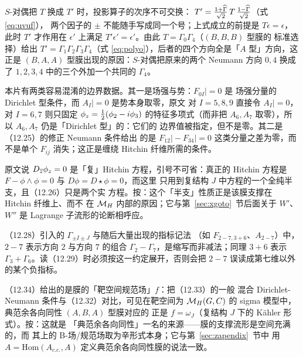 \begin{yizhu}[易错点]
$S$-对偶把 $T$ 换成 $T'$ 时，投影算子的次序不可交换：
$T'={1+{\widehat \Gamma}\over\sqrt 2}\,T\,{1-{\widehat \Gamma}\over\sqrt 2}$（式 \eqref{eq:uvuf}），
两个因子的 $\pm$ 不能随手写成同一个号；上式成立的前提是
$T\epsilon=\epsilon$，此时 $T'$ 才作用在 $\epsilon'$ 上满足
$T'\epsilon'=\epsilon'$。由此 $T=\Gamma_0\Gamma_4$（$(B,B,B)$ 型膜的
标准选择）给出 $T'=\Gamma_1\Gamma_2\Gamma_3\Gamma_4$（式
\eqref{eq:polyo}），后者的四个方向全是「$A$ 型」方向，这正是
$(B,A,A)$ 型膜出现的原因：$S$-对偶把原来的两个 Neumann 方向
$0,4$ 换成了 $1,2,3,4$ 中的三个外加一个共同的 $\Gamma_4$。
\end{yizhu}

\begin{yizhu}[易错点]
本片有两类容易混淆的边界数据。其一是场强与势：$F_{0I}|=0$ 是
场强分量的 Dirichlet 型条件，而 $A_I\vert=0$ 是势本身取零，原文
对 $I=5,8,9$ 直接令 $A_I\vert=0$，对 $I=6,7$ 则只固定
$\phi_z={1\over 2}(\phi_2-i\phi_3)$ 的特征多项式（而非把
$A_6,A_7$ 取零），所以 $A_6,A_7$ 仍是「Dirichlet 型」的：它们的
边界值被指定，但不是零。其二是（12.25）的修正 Neumann 条件给出
的是 $F_{12}\vert-F_{34}\vert=0$ 这类分量之差为零，而不是单个
$F_{ij}$ 消失；这正是缠绕 Hitchin 纤维所需的条件。
\end{yizhu}

\begin{yizhu}[含糊点拨]
原文说 $D_{\overline z}\phi_z=0$ 是「复」Hitchin 方程，引号不可省：真正的
Hitchin 方程是 $F-\phi\wedge\phi=0$ 与 $D\phi=D\star\phi=0$，而这里
只用到复结构 $J$ 中方程的一个全纯半支，且（12.26）只是两个实
方程。按：这个「半支」性质正是该膜支撑在 Hitchin 纤维上、而不
在 ${{{\mathcal{M}}}_H}$ 内部的原因；它与第~\ref{sec:xgoto}~节后面关于 $W'$、$W''$
是 Lagrange 子流形的论断相呼应。
\end{yizhu}

\begin{yizhu}[含糊点拨]
（12.28）引入的 $\Gamma_{\pm I\pm J}$ 与随后大量出现的指标记法
（如 $F_{2-7,3+6}$、$A_{2-7}$）中，$2-7$ 表示方向 $2$ 与方向 $7$
的组合 $\Gamma_2-\Gamma_7$，是缩写而非减法；同理 $3+6$ 表示
$\Gamma_3+\Gamma_6$。读（12.29）时必须按这一约定展开，否则会把
$2-7$ 误读成第七维以外的某个负指标。
\end{yizhu}

\begin{yizhu}[物理图像]
（12.34）给出的是膜的「靶空间规范场」$f$：把（12.33）的一般
混合 Dirichlet-Neumann 条件与（12.32）对比，可见在靶空间为
${{{\mathcal{M}}}_H}(G,C)$ 的 sigma 模型中，典范余各向同性 $(A,B,A)$ 型膜对应的
正是 $f=\omega_J$（复结构 $J$ 下的 Kähler 形式）。按：这就是
「典范余各向同性」一名的来源——膜的支撑流形是空间充满的，而
其上的 B-场/规范场取为辛形式本身；它与第~\ref{sec:zapendix}~节中
用 $A=\mathrm{Hom}(A_{c.c.},A)$ 定义典范余各向同性膜的说法一致。
\end{yizhu}

